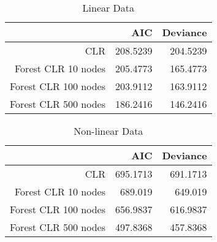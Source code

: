 \documentclass[twoside,11pt]{article}
\begin{document}
\begin{table}[htbp]
  \centering
  \caption{Linear Data}
    \begin{tabular}{rrr}
    \hline
          & AIC   & Deviance \bigstrut\\
    \hline
    CLR   & 208.5239 & 204.5239 \bigstrut[t]\\
    Forest CLR 10 nodes  & 205.4773 & 165.4773 \\
    Forest CLR 100 nodes  & 203.9112 & 163.9112 \\
    Forest CLR 500 nodes  & 186.2416 & 146.2416 \bigstrut[b]\\
    \hline
    \end{tabular}%
  \label{tab:vanilladata}%
\end{table}%

\begin{table}[htbp]
  \centering
  \caption{Non-linear Data}
    \begin{tabular}{rrr}
    \hline
          & AIC   & Deviance \bigstrut\\
    \hline
    CLR   & 695.1713 & 691.1713 \bigstrut[t]\\
    Forest CLR 10 nodes  & 689.019 & 649.019 \\
    Forest CLR 100 nodes  & 656.9837 & 616.9837 \\
    Forest CLR 500 nodes  & 497.8368 & 457.8368 \bigstrut[b]\\
    \hline
    \end{tabular}%
  \label{tab:nonlineardata}%
\end{table}%



\end{document}
